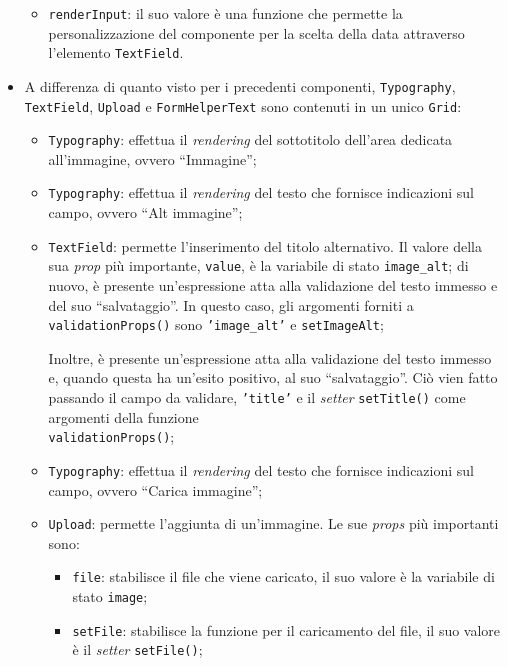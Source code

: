 \begin{itemize}
\begin{itemize}
        \item \texttt{renderInput}: il suo valore è una funzione che permette la personalizzazione del componente per la scelta della data attraverso l'elemento \texttt{TextField}.
    
    \end{itemize}
    
    \item A differenza di quanto visto per i precedenti componenti, \texttt{Typography}, \texttt{TextField}, \texttt{Upload} e \texttt{FormHelperText} sono contenuti in un unico \texttt{Grid}: 
    \begin{itemize}
        \item \texttt{Typography}: effettua il \textit{rendering} del sottotitolo dell'area dedicata all'immagine, ovvero “Immagine”;
        
        \item \texttt{Typography}: effettua il \textit{rendering} del testo che fornisce indicazioni sul campo, ovvero “Alt immagine”;
        
        \item \texttt{TextField}: permette l'inserimento del titolo alternativo. Il valore della sua \textit{prop} più importante, \texttt{value}, è la variabile di stato \texttt{image\_alt}; di nuovo, è presente un'espressione atta alla validazione del testo immesso e del suo “salvataggio”. In questo caso, gli argomenti forniti a \texttt{validationProps()} sono \texttt{'image\_alt'} e \texttt{setImageAlt};
        
        Inoltre, è presente un'espressione atta alla validazione del testo immesso e, quando questa ha un'esito positivo, al suo “salvataggio”. Ciò vien fatto passando il campo da validare, \texttt{'title'} e il \textit{setter} \texttt{setTitle()} come argomenti della funzione \\\texttt{validationProps()};
        
        \item \texttt{Typography}: effettua il \textit{rendering} del testo che fornisce indicazioni sul campo, ovvero “Carica immagine”;
        
        \item \texttt{Upload}: permette l'aggiunta di un'immagine. Le sue \textit{props} più importanti sono:
        \begin{itemize}
            \item \texttt{file}: stabilisce il file che viene caricato, il suo valore è la variabile di stato \texttt{image};
            
            \item \texttt{setFile}: stabilisce la funzione per il caricamento del file, il suo valore è il \textit{setter} \texttt{setFile()};           
        \end{itemize}
        
    \end{itemize}
\end{itemize}
